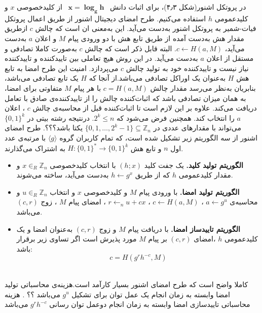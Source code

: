 در پروتکل اشنور(شکل ۴٫۳)، برای اثبات دانش
~$\pmb{x = \log_g h}$~
از کلیدخصوصی 
$x$
و کلیدعمومی
$h$
استفاده می‌کنیم.
طرح امضای دیجیتال اشنور از طریق اعمال پروتکل فیات-شمیر به پروتکل اشنور به‌دست می‌آید. این به‌معنی ان است که چالش
$c$
ازطریق مقدار هش به‌دست‌ آمده از طریق تابع هش با دو ورودی پیام
$M$
و اعلان
$a$
به‌دست می‌آید،
$c \leftarrow H(a,M)$.
البته قابل ذکر است که چالش
$c$
به‌صورت کاملا تصادفی و مستقل از اعلان
$a$
به‌دست می‌آید. در این روش هیچ تعاملی بین تاییدکننده و تاییدکننده نیاز نیست  و تاییدکننده خود به تولید چالش
$c$
می‌پردازد. امنیت این طرح امضا به تابع هش
$H$‌‌
به‌عنوان یک اوراکل تصادفی می‌باشد.از آنجا که 
$H$
یک تابع تصادفی می‌باشد، بنابریان به‌نظر می‌رسد  مقدار چالش
$c= H(a,M)$
با هر پیام 
$M$
متفاوتی برای امضا، به همان میزان تصادفی باشد که اثبات‌کننده چالش را از تاییدکننده‌ی صادق با تعامل دریافت می‌کند. علاوه بر این لازم است تا اثبات‌کننده قبل از محاسبه‌ی چالش
$c$
، اعلان 
$a$
را انتخاب کند.
همچنین فرض می‌شود که 
$2^k \leq n$.
درنتیجه رشته بیتی در
$\{0,1\}^k$
می‌تواند با مقدارهای عددی در 
$\{0,1, \dots , 2^k-1\} \subseteq \mathbb{Z}_n$
یکتا باشد؟؟؟.
طرح امضای اشنور از سه الگوریتم زیر تشکیل شده است، که تمام کاربران گروه
$\langle g \rangle$
با مرتبه‌ی عدد اول
$n$ 
و تابع هش
$H : \{0,1\}^* \rightarrow \{0,1\}^k$
به اشتراک می‌گذارند.
\begin{itemize}
	\item{\textbf{الگوریتم تولید کلید.}}
	یک جفت کلید
	$(h;x)$
	با انتخاب کلیدخصوصی
	$x \in_R \mathbb{Z}_n$
	و مقدار کلیدعمومی
	$h$
	که از طریق 
	$h \leftarrow g^x$
	به‌دست می‌آید، ساخته می‌شوند.
	\item{\textbf{الگوریتم تولید امضا.}}
	با ورودی پیام
	$M$
	و کلیدخصوصی
	$x$
	و انتخاب
	$u \in_R \mathbb{Z}_n$
	و محاسبه‌ی 
	$a \leftarrow g^u$
	،
	$c \leftarrow H(a,M) $
	،
	$ r \leftarrow_n u + cx $
	، امضای پیام
	$M$
	، زوج
	$(c,r)$
	می‌باشد.
	\item{\textbf{الگوریتم تاییدساز امضا.}}
	با دریافت پیام
	$M$
	و زوج
	$(c,r)$
	به‌عنوان امضا و یک کلیدعمومی
	$h$
	،امضای
	$(c,r)$
	بر پیام
	$M$
	مورد پذیرش است اگر تساوی زیر برقرار باشد:
	$$ c = H(g^rh^{-c}, M) $$
\end{itemize}~
\\

کاملا واضح است که طرح امضای اشنور بسیار کارآمد است.هزینه‌ی محاسباتی تولید امضا وابسته به زمان انجام یک عمل توان برای تشکیل
$g^u$
می‌باشد ؟؟ .
هزینه محاسباتی تاییدسازی امضا وابسته به زمان انجام دوعمل توان رسانی
$g^rh^{-c}$
می‌باشد







